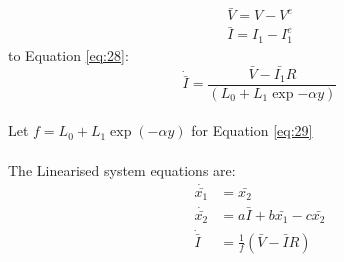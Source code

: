     \begin{align}
        \bar{V} = V - V^e \nonumber \\
        \bar{I} = I_1 - I_1^e \nonumber
    \end{align}
    to Equation \eqref{eq:28}:
    \begin{equation}\label{eq:29}
        \dot{\bar{I}} = \frac{\bar{V} - \bar{I_1}R}{\left(L_{0} + L_{1}\exp{- \alpha y}\right)}
    \end{equation}
    \hfill \break \\
    Let $f = {L_{0} + L_{1}\exp{(- \alpha y)}}$ for Equation \eqref{eq:29}\\
    \hfill \break \\
    The Linearised system equations are: \\
    \begin{align}
        \dot{\bar{x_1}} &= \bar{x_2}\label{eq:30} \\
        \dot{\bar{x_2}} &= a\bar{I} + b\bar{x_1} -c\bar{x_2}\label{eq:31} \\
        \dot{\bar{I}} &= \frac{1}{f}(\bar{V} - \bar{I}R)\label{eq:32}
    \end{align}